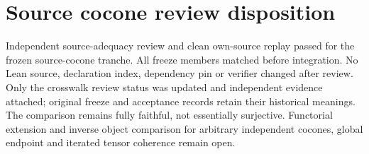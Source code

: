 \documentclass{article}
\begin{document}
\section*{Source cocone review disposition}
Independent source-adequacy review and clean own-source replay passed for the frozen source-cocone tranche. All freeze members matched before integration. No Lean source, declaration index, dependency pin or verifier changed after review. Only the crosswalk review status was updated and independent evidence attached; original freeze and acceptance records retain their historical meanings.
The comparison remains fully faithful, not essentially surjective. Functorial extension and inverse object comparison for arbitrary independent cocones, global endpoint and iterated tensor coherence remain open.
\end{document}
